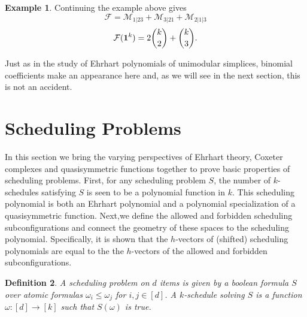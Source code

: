 \documentclass[12pt,reqno]{amsart}
\newtheorem{definition}{Definition}
\numberwithin{definition}{section}
\newtheorem{lemma}[definition]{Lemma}
\theoremstyle{definition}
\newtheorem{example}[definition]{Example}
\newcommand{\SSS}{\mathcal{S}}
\newcommand{\defn}[1]{\emph{#1}}
\newcommand{\ncM}{\mathcal{M}}
\newcommand{\poly}{\chi} %
\newcommand{\comment}[1]{\textsf{\footnotesize #1}}
\begin{document}
\begin{example}
 Continuing the example above gives
$$\mathcal{F} = \ncM_{1|23} + \ncM_{3|21} + \ncM_{2|1|3}$$
$$ \mathcal{F}({\bf 1}^k) = 2 {k \choose 2} + {k \choose 3}.$$  
\end{example}

Just as in the study of Ehrhart polynomials of unimodular simplices, binomial coefficients make an appearance here and, as we will see in the next section, this is not an accident.






\section{Scheduling Problems}
\label{sec:scheduling-problems}

In this section we bring the varying perspectives of Ehrhart theory, Coxeter complexes and quasisymmetric functions together to prove basic properties of scheduling problems.  First, for any scheduling problem $S$, the number of $k$-schedules satisfying $S$ is seen to be a polynomial function in $k$.  This scheduling polynomial is both an Ehrhart polynomial and a polynomial specialization of a quasisymmetric function.  Next,we define the allowed and forbidden scheduling subconfigurations and connect the geometry of these spaces to the scheduling polynomial.  Specifically, it is shown that the $h$-vectors of (shifted) scheduling polynomials are equal to the the $h$-vectors of the allowed and forbidden subconfigurations.  


\begin{definition}
A \defn{scheduling problem} on $d$ items is given by a boolean
formula $S$ over atomic formulas $\omega_i\leq \omega_j$ for
$i,j\in[d]$. A \defn{$k$-schedule} solving $S$ is a function
$\omega:[d]\rightarrow[k]$ such that $S(\omega)$ is true.
\end{definition}
\end{document}
